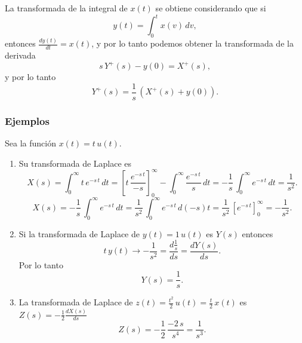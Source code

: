 La transformada de la integral de $x(t)$ se obtiene considerando que si
\begin{equation}
y(t) = \int_{0}^{t} x(v) \, dv,
\end{equation}
entonces $\frac{d y(t)}{dt} = x(t)$, y por lo tanto podemos obtener la
transformada de la derivada
\begin{equation}
  s \, Y^{+}(s) - y(0) = X^{+}(s),
\end{equation}
y por lo tanto
\begin{equation}
Y^{+}(s) = \frac{1}{s} \, (X^{+}(s) + y(0)).
\end{equation}

\subsubsection{Ejemplos}

Sea la funci\'{o}n $x(t) = t \, u(t)$.
\begin{enumerate}
\item Su transformada de Laplace es
\begin{equation}
X(s) = \int_{0}^{\infty} t \, e^{-s \, t} \, dt = 
\left[ t \, \frac{e^{-s \, t}}{-s}\right]_{0}^{\infty} - \int_{0}^{\infty} \frac{e^{-s \, t}}{s} \, dt = 
-\frac{1}{s} \, \int_{0}^{\infty}e^{-s \, t} \, dt = \frac{1}{s^{2}}.
\end{equation}
\begin{equation}
	X(s) =
	-\frac{1}{s} \, \int_{0}^{\infty}e^{-s \, t} \, dt = 
	\frac{1}{s^{2}} \, \int_{0}^{\infty}e^{-s \, t} \, d(-s)t =
	\frac{1}{s^{2}} \, \left[e^{-s \, t}\right]_{0}^{\infty} =	
	-\frac{1}{s^{2}}.
\end{equation}
\item Si la transformada de Laplace de $y(t) = 1 \, u(t)$ es $Y(s)$ entonces
\begin{equation}
	t \, y(t) \rightarrow -\frac{1}{s^{2}} = \frac{d \frac{1}{s} }{ds} = \frac{d Y(s) }{ds}.
\end{equation}
Por lo tanto
\begin{equation}
Y(s) = \frac{1}{s}.
\end{equation}

\item La transformada de Laplace de $z(t) = \frac{t^{2}}{2} \, u(t) = \frac{t}{2} \, x(t)$ es $Z(s) = -\frac{1}{2} \frac{d X(s)}{ds}$
\begin{equation}
Z(s) = -\frac{1}{2} \, \frac{-2 \, s}{s^{4}} = \frac{1}{s^{3}}.
\end{equation}
\end{enumerate}

